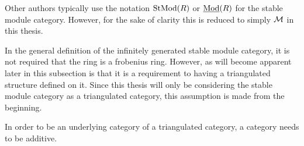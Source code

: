 Other authors typically use the notation \( \operatorname{StMod}(R) \) or \( \underline{\operatorname{Mod}}(R) \) for the stable module category. However, for the sake of clarity this is reduced to simply \( {\mathcal{M}} \) in this thesis.

In the general definition of the infinitely generated stable module category, it is not required that the ring is a frobenius ring. However, as will become apparent later in this subsection is that it is a requirement to having a triangulated structure defined on it. Since this thesis will only be considering the stable module category as a triangulated category, this assumption is made from the beginning.

In order to be an underlying category of a triangulated category, a category needs to be additive.

